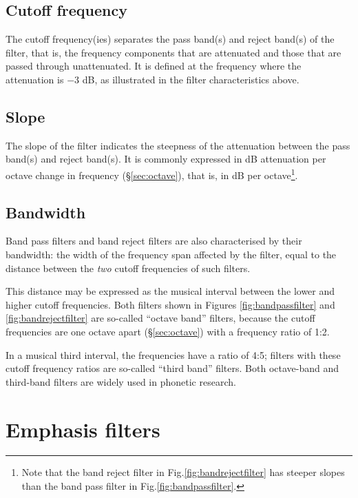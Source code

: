 \documentclass[
]{book}
\begin{document}
\subsection{Cutoff frequency}\label{cutoff-frequency}

The cutoff frequency(ies) separates the pass band(s) and reject band(s) of the filter, that is, the frequency components that are attenuated and those that are passed through unattenuated. It is defined at the frequency where the attenuation is \(-3\) dB, as illustrated in the filter characteristics above.

\subsection{Slope}\label{slope}

The slope of the filter indicates the steepness of the attenuation between the pass band(s) and reject band(s). It is commonly expressed in dB attenuation per octave change in frequency (§\ref{sec:octave}), that is, in dB per octave\footnote{Note that the band reject filter in Fig.\ref{fig:bandrejectfilter} has steeper slopes than the band pass filter in Fig.\ref{fig:bandpassfilter}.}.

\subsection{Bandwidth}\label{sec:filterbandwidth}

Band pass filters and band reject filters are also characterised by their bandwidth: the width of the frequency span affected by the filter, equal to the distance between the \emph{two} cutoff frequencies of such filters.

This distance may be expressed as the musical interval between the lower and higher cutoff frequencies. Both filters shown in Figures \ref{fig:bandpassfilter} and \ref{fig:bandrejectfilter} are so-called ``octave band'' filters, because the cutoff frequencies are one octave apart (§\ref{sec:octave}) with a frequency ratio of 1:2.

In a musical third interval, the frequencies have a ratio of 4:5; filters with these cutoff frequency ratios are so-called ``third band'' filters. Both octave-band and third-band filters are widely used in phonetic research.

\section{Emphasis filters}\label{sec:emphasisfilters}
\end{document}
